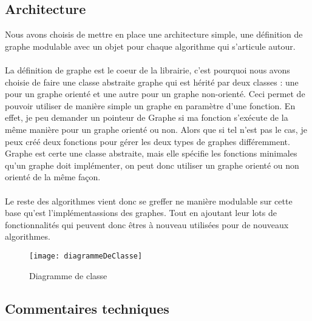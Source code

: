 \begin{titlepage}
\newpage
\begin{center}
\begin{bf}
\section{Architecture}
\end{bf}
\end{center}

\vspace{1cm}
{
Nous avons choisis de mettre en place une architecture simple, une définition de graphe modulable avec un objet pour chaque algorithme qui s'articule autour.
\\ \\
La définition de graphe est le coeur de la librairie, c'est pourquoi nous avons choisie de faire une classe abstraite graphe qui est hérité par deux classes : une pour un graphe orienté et une autre pour un graphe non-orienté. Ceci permet de pouvoir utiliser de manière simple un graphe en paramètre d'une fonction. En effet, je peu demander un pointeur de Graphe si ma fonction s'exécute de la même manière pour un graphe orienté ou non. Alors que si tel n'est pas le cas, je peux créé deux fonctions pour gérer les deux types de graphes différemment. Graphe est certe une classe abstraite, mais elle spécifie les fonctions minimales qu'un graphe doit implémenter, on peut donc utiliser un graphe orienté ou non orienté de la même façon.
\\ \\
Le reste des algorithmes vient donc se greffer ne manière modulable sur cette base qu'est l'implémentassions des graphes. Tout en ajoutant leur lots de fonctionnalités qui peuvent donc êtres à nouveau utilisées pour de nouveaux algorithmes.
\begin{figure}[]
\centering
\texttt{[image: diagrammeDeClasse]}
\caption{Diagramme de classe}
\end{figure}
}


\newpage
\begin{center}
\begin{bf}
\section{Commentaires techniques}
\end{bf}
\end{center}


\end{titlepage}
